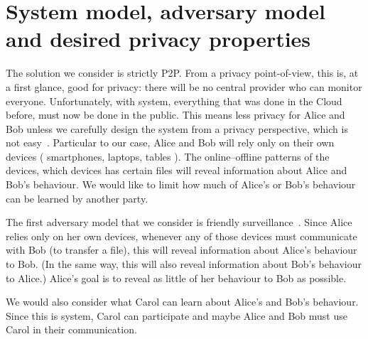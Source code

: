 \section{System model, adversary model and desired privacy properties}%
\label{Privacy}

The solution we consider is strictly \ac{P2P}.
From a privacy point-of-view, this is, at a first glance, good for privacy: 
there will be no central provider who can monitor everyone.
Unfortunately, with  system, everything that was done in the Cloud 
before, must now be done in the public.
This means less privacy for Alice and Bob unless we carefully design the system 
from a privacy perspective, which is not easy~\cite{DevilInMetadata}.
Particular to our case, Alice and Bob will rely only on their own devices (\eg 
smartphones, laptops, tables \etc).
The online--offline patterns of the devices, which devices has certain files 
\etc will reveal information about Alice and Bob's behaviour.
We would like to limit how much of Alice's or Bob's behaviour can be learned by 
another party.

The first adversary model that we consider is friendly 
surveillance~\cite{FriendlySurveillance}.
Since Alice relies only on her own devices, whenever any of those devices must 
communicate with Bob (\eg to transfer a file), this will reveal information 
about Alice's behaviour to Bob.
(In the same way, this will also reveal information about Bob's behaviour to 
Alice.)
Alice's goal is to reveal as little of her behaviour to Bob as possible.

We would also consider what Carol can learn about Alice's and Bob's behaviour.
Since this is  system, Carol can participate and maybe Alice and Bob 
must use Carol in their communication.

